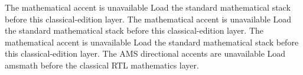 {    \OLClassicalRTLMathSupportedfalse
    \OLClassicalRTLMathError
      {The mathematical accent \string\widehat\space is unavailable}
      {Load the standard mathematical stack before this classical-edition layer.}%
  \fi
  \ifdefined\tilde\else
    \OLClassicalRTLMathSupportedfalse
    \OLClassicalRTLMathError
      {The mathematical accent \string\tilde\space is unavailable}
      {Load the standard mathematical stack before this classical-edition layer.}%
  \fi
  \ifdefined\widetilde\else
    \OLClassicalRTLMathSupportedfalse
    \OLClassicalRTLMathError
      {The mathematical accent \string\widetilde\space is unavailable}
      {Load the standard mathematical stack before this classical-edition layer.}%
  \fi
  \ifdefined\underrightarrow\else
    \OLClassicalRTLMathSupportedfalse
    \OLClassicalRTLMathError
      {The AMS directional accents are unavailable}
      {Load amsmath before the classical RTL mathematics layer.}%
  \fi
}

\newcommand*{\OLClassicalSavedRegistry}[1]{%
  \csname OLClassicalSavedRegistry@#1\endcsname
}
\newcommand*{\OLClassicalRegistryDispatch}[2]{%
  \ifnum\OLClassicalDesiredMathDirection=\@ne
    \OLClassicalSavedRegistry{#2}%
  \else
    \OLClassicalSavedRegistry{#1}%
  \fi
}

